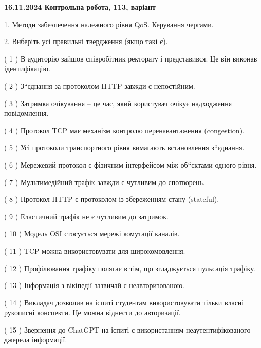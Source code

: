 \documentclass[12pt, ukrainian]{article}
\begin{document}
\vspace{4mm}
\newpage
\begin {large}

\textbf{16.11.2024 Контрольна робота, 113, варіант  }\par


{
1. Методи забезпечення належного рівня QoS. Керування чергами.



\vspace{5mm}
2. Виберіть усі правильні твердження (якщо такі є).\par
\vspace{2mm}

( 1 ) В аудиторію зайшов співробітник ректорату і представився. Це він виконав ідентифікацію.

( 2 ) З“єднання за протоколом  HTTP завжди є непостійним.

( 3 ) Затримка очікування – це час, який користувач очікує надходження повідомлення.

( 4 ) Протокол TCP має механізм контролю перенавантаження (congestion).

( 5 ) Усі протоколи транспортного рівня вимагають встановлення з“єднання.

( 6 ) Мережевий протокол є фізичним інтерфейсом між об“єктами одного рівня.

( 7 ) Мультимедійний трафік завжди є чутливим до спотворень.

( 8 ) Протокол  HTTP є протоколом із збереженням стану (stateful).

( 9 ) Еластичний трафік не є чутливим до затримок.

( 10 ) Модель OSI стосується мережі комутації каналів.

( 11 ) TCP можна використовувати для широкомовлення.

( 12 ) Профілювання трафіку полягає в тім, що згладжується пульсація трафіку.

( 13 ) Інформація з вікіпедії зазвичай є неавторизованою.

( 14 ) Викладач дозволив на іспиті студентам використовувати тільки власні рукописні конспекти. Це можна віднести до авторизації.

( 15 ) Звернення до ChatGPT на іспиті є використанням неаутентифікованого джерела інформації.
}
\end {large}
\end{document}

